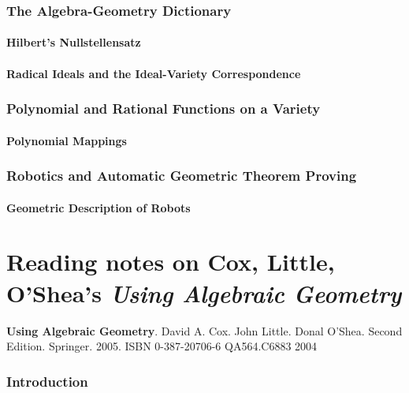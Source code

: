\documentclass[10pt]{amsart}
\begin{document}
\begin{multicols*}{2}
\section{The Algebra-Geometry Dictionary}


\subsection{Hilbert's Nullstellensatz}


\subsection{Radical Ideals and the Ideal-Variety Correspondence}



\section{Polynomial and Rational Functions on a Variety}


\subsection{Polynomial Mappings }


\section{Robotics and Automatic Geometric Theorem Proving}



\subsection{Geometric Description of Robots}






\part{Reading notes on Cox, Little, O'Shea's \emph{Using Algebraic Geometry}}

\textbf{Using Algebraic Geometry}.  David A. Cox.  John Little. Donal O'Shea. Second Edition.  Springer.  2005.  ISBN 0-387-20706-6 QA564.C6883 2004

\section{ Introduction }


\end{multicols*}
\end{document}
